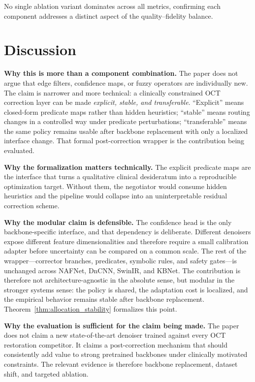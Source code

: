 \documentclass{ieeetj}
\begin{document}
No single ablation variant dominates across all metrics, confirming each component addresses a distinct aspect of the quality--fidelity balance.

\section{Discussion}
\label{sec:discussion}

\textbf{Why this is more than a component combination.}
The paper does not argue that edge filters, confidence maps, or fuzzy operators are individually new. The claim is narrower and more technical: a clinically constrained OCT correction layer can be made \emph{explicit, stable, and transferable}. ``Explicit'' means closed-form predicate maps rather than hidden heuristics; ``stable'' means routing changes in a controlled way under predicate perturbations; ``transferable'' means the same policy remains usable after backbone replacement with only a localized interface change. That formal post-correction wrapper is the contribution being evaluated.

\textbf{Why the formalization matters technically.}
The explicit predicate maps are the interface that turns a qualitative clinical desideratum into a reproducible optimization target. Without them, the negotiator would consume hidden heuristics and the pipeline would collapse into an uninterpretable residual correction scheme.

\textbf{Why the modular claim is defensible.}
The confidence head is the only backbone-specific interface, and that dependency is deliberate. Different denoisers expose different feature dimensionalities and therefore require a small calibration adapter before uncertainty can be compared on a common scale. The rest of the wrapper---corrector branches, predicates, symbolic rules, and safety gates---is unchanged across NAFNet, DnCNN, SwinIR, and KBNet. The contribution is therefore not architecture-agnostic in the absolute sense, but modular in the stronger systems sense: the policy is shared, the adaptation cost is localized, and the empirical behavior remains stable after backbone replacement. Theorem~\ref{thm:allocation_stability} formalizes this point.

\textbf{Why the evaluation is sufficient for the claim being made.}
The paper does not claim a new state-of-the-art denoiser trained against every OCT restoration competitor. It claims a post-correction mechanism that should consistently add value to strong pretrained backbones under clinically motivated constraints. The relevant evidence is therefore backbone replacement, dataset shift, and targeted ablation.
\end{document}
